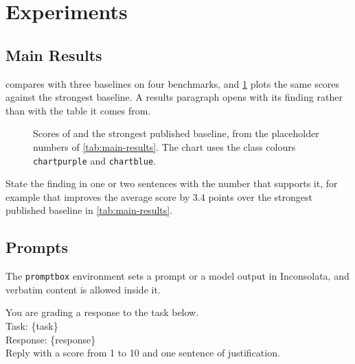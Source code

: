 \section{Experiments}
\label{sec:experiments}

\subsection{Main Results}
\label{sec:main-results}

 compares \method{} with three baselines on four benchmarks, and \cref{fig:benchmark-scores} plots the same scores against the strongest baseline.
A results paragraph opens with its finding rather than with the table it comes from.

\begin{table}[t]
  \centering
  \caption{Main results on four benchmarks. The best score in each column is in bold and the second best is underlined. All numbers are placeholders.}
  \label{tab:main-results}
  
\end{table}

\begin{figure}[t]
  \centering
  
  \caption{Scores of \method{} and the strongest published baseline, from the placeholder numbers of \cref{tab:main-results}. The chart uses the class colours \texttt{chartpurple} and \texttt{chartblue}.}
  \label{fig:benchmark-scores}
\end{figure}

\begin{takeaway}[Takeaway]
State the finding in one or two sentences with the number that supports it, for example that \method{} improves the average score by 3.4 points over the strongest published baseline in \cref{tab:main-results}.
\end{takeaway}

\subsection{Prompts}
\label{sec:prompts}

The \texttt{promptbox} environment sets a prompt or a model output in Inconsolata, and verbatim content is allowed inside it.

\begin{promptbox}
You are grading a response to the task below.\\
Task: \{task\}\\
Response: \{response\}\\
Reply with a score from 1 to 10 and one sentence of justification.
\end{promptbox}
